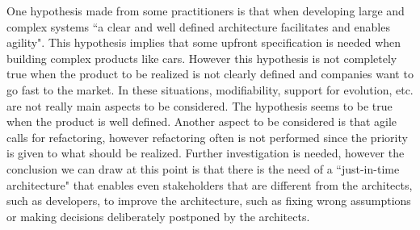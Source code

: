 %
One hypothesis made from some practitioners is that when developing large and complex systems ``a clear and well defined architecture facilitates and enables
agility". This hypothesis implies that some upfront specification is needed when building complex products like cars.
However this hypothesis is not completely true when the product to be realized is not clearly defined and companies
want to go fast to the market. In these situations, modifiability, support for evolution, etc. are not really main aspects
to be considered. The hypothesis seems to be true when the product is well defined. Another aspect to be considered
is that agile calls for refactoring, however refactoring often is not performed since the priority is given to what should
be realized.
Further investigation is needed, however the conclusion we can draw at this point is that there is the need of a
``just-in-time architecture" that enables even stakeholders that are different from the architects, such as developers, to
improve the architecture, such as fixing wrong assumptions or making decisions deliberately postponed by the
architects.




